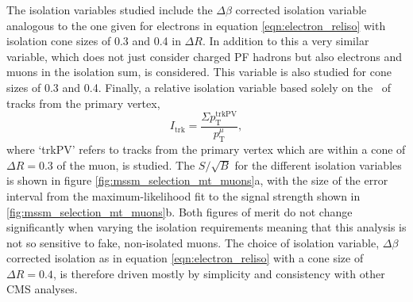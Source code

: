 The isolation variables studied include
the $\Delta\beta$ corrected isolation variable analogous
to the one given for electrons in equation \ref{eqn:electron_reliso} with 
isolation cone sizes of 0.3 and 0.4 in $\Delta R$. In addition
to this a very similar
variable, which does not just consider charged \ac{PF} hadrons but
also electrons and muons in the isolation sum, is considered. This
variable is also studied for cone sizes of 0.3 and 0.4. Finally,
a relative isolation variable based solely on the \pT~of tracks from the primary
vertex,
\begin{equation}\label{eqn:reltrkiso}
I_{\text{trk}} = \frac{\Sigma p_{\text{T}}^{\text{trkPV}}}{p_{\text{T}}^{\mu}}, \end{equation} 
where `trkPV' refers to tracks from the primary vertex which are within a cone of $\Delta R=0.3$ of the muon,
is studied. The $S/\sqrt{B}$ for the different isolation variables is shown in figure \ref{fig:mssm_selection_mt_muons}a, with the
size of the error interval from the maximum-likelihood fit to the \Ztautau signal strength shown in 
\ref{fig:mssm_selection_mt_muons}b. Both figures of merit do not
change significantly when varying the isolation requirements meaning that this analysis
is not so sensitive to fake, non-isolated muons. The choice of isolation variable, $\Delta\beta$
corrected isolation as in equation \ref{eqn:electron_reliso} with a cone size of $\Delta R=0.4$, is therefore
driven mostly by simplicity and consistency with other \ac{CMS} analyses. 

